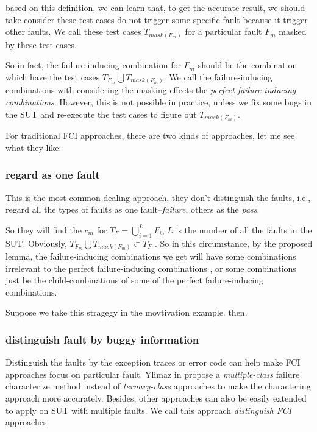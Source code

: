 \documentclass{sig-alternate}
\begin{document}
based on this definition, we can learn that, to get the accurate result, we should take consider these test cases do not trigger some specific fault because it trigger other faults. We call these test cases $T_{mask(F_{m})}$ for a particular fault $F_{m}$ masked by these test cases.

So in fact, the failure-inducing combination for $F_{m}$ should be the combination which have the test cases $T_{F_{m}} \bigcup T_{mask(F_{m})}$. We call the failure-inducing combinations with considering the masking effects the \emph{perfect failure-inducing combinations}. However, this is not possible in practice, unless we fix some bugs in the SUT and re-execute the test cases to figure out $T_{mask(F_{m})}$.

For traditional FCI approaches, there are two kinds of approaches, let me see what they like:

\subsubsection{regard as one fault}
This is the most common dealing approach, they don't distinguish the faults, i.e., regard all the types of faults as one fault--\emph{failure}, others as the \emph{pass}.

So they will find the $c_{m}$ for $T_{F} = \bigcup_{i = 1}^{L}F_{i}$, $L$ is the number of all the faults in the SUT. Obviously, $T_{F_{m}} \bigcup T_{mask(F_{m})} \subset T_{F}$ . So in this circumstance, by the proposed lemma, the failure-inducing combinations we get will have some combinations irrelevant to the perfect failure-inducing combinations , or some combinations just be the child-combinations of some of the perfect failure-inducing combinations.

Suppose we take this stragegy in the movtivation example. then.

\subsubsection{distinguish fault by buggy information}
Distinguish the faults by the exception traces or error code can help make FCI approaches focus on particular fault. Ylimaz in  \cite{yilmaz2013reducing} propose a \emph{multiple-class} failure characterize method instead of \emph{ternary-class} approaches to make the charactering approach more accurately. Besides, other approaches can also be easily extended to apply on SUT with multiple faults. We call this approach \emph{distinguish FCI} approaches.
\end{document}
